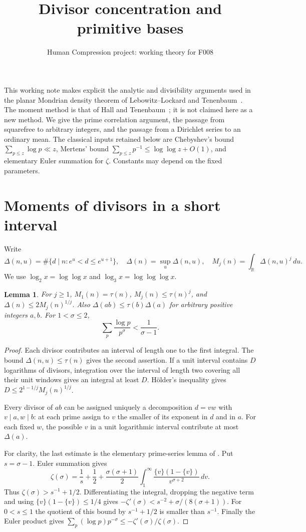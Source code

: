 \documentclass[11pt,a4paper]{article}
\title{Divisor concentration and primitive bases}
\author{Human Compression project: working theory for F008}
\date{}
\newtheorem{lemma}[theorem]{Lemma}
\newcommand{\Del}{\Delta}
\begin{document}
\maketitle
This working note makes explicit the analytic and divisibility arguments
used in the planar Mondrian density theorem of Lebowitz--Lockard and
Tenenbaum~\cite{LLT}. The moment method is that of Hall and
Tenenbaum~\cite{HT}; it is not claimed here as a new method. We give the
prime correlation argument, the passage from squarefree to arbitrary
integers, and the passage from a Dirichlet series to an ordinary mean.
The classical inputs retained below are Chebyshev's bound
$\sum_{p\le z}\log p\ll z$, Mertens' bound
$\sum_{p\le z}p^{-1}\le\log\log z+O(1)$, and elementary Euler summation
for $\zeta$. Constants may depend on the fixed parameters.

\section{Moments of divisors in a short interval}
Write
\[
 \Del(n,u)=\#\{d\mid n:e^u<d\le e^{u+1}\},\quad
 \Del(n)=\sup_u\Del(n,u),\quad
 M_j(n)=\int_{\mathbb R}\Del(n,u)^j\,du.
\]
We use $\log_2x=\log\log x$ and $\log_3x=\log\log\log x$.

\begin{lemma}\label{basic}
For $j\ge1$, $M_1(n)=\tau(n)$,
$M_j(n)\le\tau(n)^j$, and $\Del(n)\le2M_j(n)^{1/j}$.
Also $\Del(ab)\le\tau(b)\Del(a)$ for arbitrary positive integers $a,b$.
For $1<\sigma\le2$,
\[
 \sum_p\frac{\log p}{p^\sigma}<\frac1{\sigma-1}.
\]
\end{lemma}
\begin{proof}
Each divisor contributes an interval of length one to the first integral.
The bound $\Del(n,u)\le\tau(n)$ gives the second assertion.
If a unit interval contains $D$ logarithms of divisors, integration over
the interval of length two covering all their unit windows gives an
integral at least $D$. H\"older's inequality gives
$D\le2^{1-1/j}M_j(n)^{1/j}$.

Every divisor of $ab$ can be assigned uniquely a decomposition $d=vw$
with $v\mid a,w\mid b$: at each prime assign to $v$ the smaller of its
exponent in $d$ and in $a$. For each fixed $w$, the possible $v$ in a
unit logarithmic interval contribute at most $\Del(a)$.

For clarity, the last estimate is the elementary prime-series lemma of
\cite[Lemma 1]{HT}. Put $s=\sigma-1$. Euler summation gives
\[
 \zeta(\sigma)=\frac1s+\frac12+
 \frac{\sigma(\sigma+1)}2
 \int_1^\infty\frac{\{v\}(1-\{v\})}{v^{\sigma+2}}\,dv.
\]
Thus $\zeta(\sigma)>s^{-1}+1/2$. Differentiating the integral, dropping
the negative term and using $\{v\}(1-\{v\})\le1/4$ gives
$-\zeta'(\sigma)<s^{-2}+\sigma/(8(\sigma+1))$.
For $0<s\le1$ the quotient of this bound by $s^{-1}+1/2$ is smaller
than $s^{-1}$. Finally the Euler product gives
$\sum_p(\log p)p^{-\sigma}\le-\zeta'(\sigma)/\zeta(\sigma)$.
\end{proof}
\end{document}
